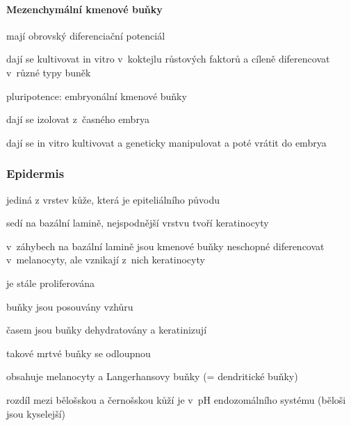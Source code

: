 \documentclass[DIV=8]{scrreprt}
\begin{document}
\paragraph{Mezenchymální kmenové buňky}
\begin{myItemize}[nosep]
    \item mají obrovský diferenciační potenciál
    \item dají se kultivovat in vitro v koktejlu růstových faktorů a cíleně diferencovat v různé typy buněk
    \item pluripotence: embryonální kmenové buňky
\begin{myItemize}[nosep]
    \item dají se izolovat z časného embrya
    \item dají se in vitro kultivovat a geneticky manipulovat a poté vrátit do embrya
\end{myItemize}

\end{myItemize}



\subsubsection{Epidermis} \label{Epidermis}


\begin{myItemize}[nosep]
    \item jediná z vrstev kůže, která je epiteliálního původu
    \item sedí na bazální lamině, nejspodnější vrstvu tvoří keratinocyty
\begin{myItemize}[nosep]
    \item v záhybech na bazální lamině jsou kmenové buňky neschopné diferencovat v melanocyty, ale vznikají z nich keratinocyty
\end{myItemize}

    \item je stále proliferována
\begin{myEnumerate}[nosep]
    \item buňky jsou posouvány vzhůru
    \item časem jsou buňky dehydratovány a keratinizují
    \item takové mrtvé buňky se odloupnou
\end{myEnumerate}

    \item obsahuje melanocyty a Langerhansovy buňky (= dendritické buňky)
    \item rozdíl mezi bělošskou a černošskou kůží je v pH endozomálního systému (běloši jsou kyselejší)
\end{myItemize}
\end{document}
